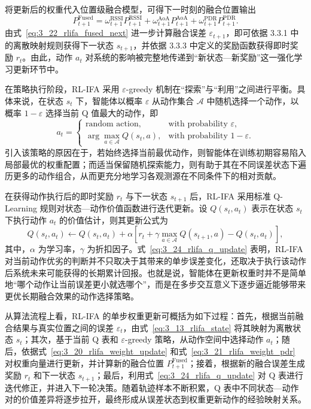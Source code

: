 将更新后的权重代入位置级融合模型，可得下一时刻的融合位置输出
\begin{equation}
P_{t+1}^{\mathrm{Fused}}
=
\omega_{t+1}^{\mathrm{RSSI}} P_{t+1}^{\mathrm{RSSI}}
+
\omega_{t+1}^{\mathrm{AoA}} P_{t+1}^{\mathrm{AoA}}
+
\omega_{t+1}^{\mathrm{PDR}} P_{t+1}^{\mathrm{PDR}}.
\label{eq:3_22_rlifa_fused_next}
\end{equation}
由式~\eqref{eq:3_22_rlifa_fused_next} 进一步计算融合误差
\(\varepsilon_{t+1}\)，即可依据 3.3.1 中的离散映射规则获得下一状态 \(s_{t+1}\)，并依据 3.3.3 中定义的奖励函数获得即时奖励 \(r_t\)。由此，动作 \(a_t\) 对系统的影响被完整地传递到“新状态—新奖励”这一强化学习更新环节中。

在策略执行阶段，RL-IFA 采用 \(\varepsilon\)-greedy 机制在“探索”与“利用”之间进行平衡。具体来说，在状态 \(s_t\) 下，智能体以概率 \(\varepsilon\) 从动作集合 \(\mathcal{A}\) 中随机选择一个动作，以概率 \(1-\varepsilon\) 选择当前 Q 值最大的动作，即
\begin{equation}
a_t=
\begin{cases}
\text{random action}, & \text{with probability } \varepsilon,\\[4pt]
\arg\max\limits_{a\in\mathcal{A}}Q(s_t,a), & \text{with probability } 1-\varepsilon.
\end{cases}
\label{eq:3_23_rlifa_epsilon_greedy}
\end{equation}
引入该策略的原因在于，若始终选择当前最优动作，则智能体在训练初期容易陷入局部最优的权重配置；而适当保留随机探索能力，则有助于其在不同误差状态下遍历更多的动作组合，从而更充分地学习各观测源在不同条件下的相对贡献。

在获得动作执行后的即时奖励 \(r_t\) 与下一状态 \(s_{t+1}\) 后，RL-IFA 采用标准 Q-Learning 规则对状态—动作价值函数进行迭代更新。设 \(Q(s_t,a_t)\) 表示在状态 \(s_t\) 下执行动作 \(a_t\) 的价值估计，则其更新公式为
\begin{equation}
Q(s_t,a_t)
\leftarrow
Q(s_t,a_t)
+
\alpha
\left[
r_t
+
\gamma \max_{a\in\mathcal{A}}Q(s_{t+1},a)
-
Q(s_t,a_t)
\right],
\label{eq:3_24_rlifa_q_update}
\end{equation}
其中，\(\alpha\) 为学习率，\(\gamma\) 为折扣因子。式~\eqref{eq:3_24_rlifa_q_update} 表明，RL-IFA 对当前动作优劣的判断并不只取决于其带来的单步误差变化，还取决于执行该动作后系统未来可能获得的长期累计回报。也就是说，智能体在更新权重时并不是简单地“哪个动作让当前误差更小就选哪个”，而是在多步交互意义下逐步逼近能够带来更优长期融合效果的动作选择策略。

从算法流程上看，RL-IFA 的单步权重更新可概括为如下过程：首先，根据当前融合结果与真实位置之间的误差 \(\varepsilon_t\)，由式~\eqref{eq:3_13_rlifa_state} 将其映射为离散状态 \(s_t\)；其次，基于当前 Q 表和 \(\varepsilon\)-greedy 策略，从动作空间中选择动作 \(a_t\)；随后，依据式~\eqref{eq:3_20_rlifa_weight_update} 和式~\eqref{eq:3_21_rlifa_weight_pdr} 对权重向量进行更新，并计算新的融合位置 \(P_{t+1}^{\mathrm{Fused}}\)；接着，根据新的融合误差生成奖励 \(r_t\) 和下一状态 \(s_{t+1}\)；最后，利用式~\eqref{eq:3_24_rlifa_q_update} 对 Q 表进行迭代修正，并进入下一轮决策。随着轨迹样本不断积累，Q 表中不同状态—动作对的价值差异将逐步拉开，最终形成从误差状态到权重更新动作的经验映射关系。

